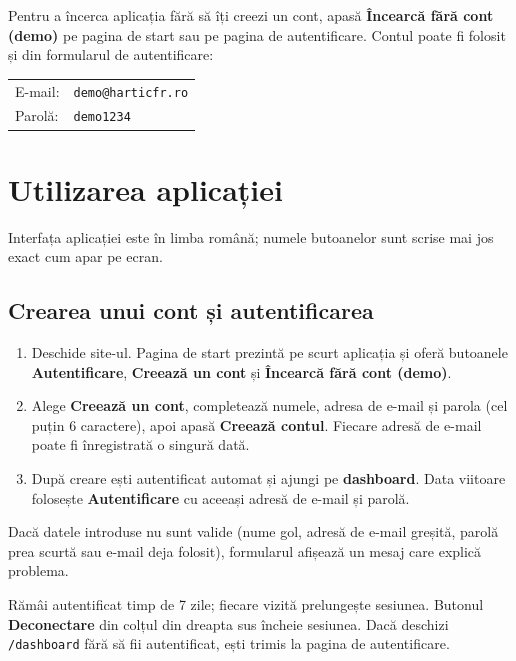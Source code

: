 \documentclass[11pt,a4paper]{article}
\newcommand{\code}[1]{\texttt{#1}}
\newcommand{\ui}[1]{\textsf{\textbf{#1}}}
\begin{document}
\begin{note}
Pentru a încerca aplicația fără să îți creezi un cont, apasă
\ui{Încearcă fără cont (demo)} pe pagina de start sau pe pagina de
autentificare. Contul poate fi folosit și din formularul de autentificare:

\begin{center}
\begin{tabular}{@{}ll@{}}
E-mail: & \code{demo@harticfr.ro} \\
Parolă: & \code{demo1234} \\
\end{tabular}
\end{center}
\end{note}

\section{Utilizarea aplicației}
\label{sec:usage}

Interfața aplicației este în limba română; numele butoanelor sunt scrise
mai jos exact cum apar pe ecran.

\subsection{Crearea unui cont și autentificarea}

\begin{enumerate}
  \item Deschide site-ul. Pagina de start prezintă pe scurt aplicația și
        oferă butoanele \ui{Autentificare}, \ui{Creează un cont} și
        \ui{Încearcă fără cont (demo)}.
  \item Alege \ui{Creează un cont}, completează numele, adresa de e-mail și
        parola (cel puțin 6 caractere), apoi apasă \ui{Creează contul}.
        Fiecare adresă de e-mail poate fi înregistrată o singură dată.
  \item După creare ești autentificat automat și ajungi pe
        \textbf{dashboard}. Data viitoare folosește \ui{Autentificare} cu
        aceeași adresă de e-mail și parolă.
\end{enumerate}

Dacă datele introduse nu sunt valide (nume gol, adresă de e-mail greșită,
parolă prea scurtă sau e-mail deja folosit), formularul afișează un mesaj care
explică problema.

Rămâi autentificat timp de 7 zile; fiecare vizită prelungește sesiunea.
Butonul \ui{Deconectare} din colțul din dreapta sus încheie sesiunea. Dacă
deschizi \code{/dashboard} fără să fii autentificat, ești trimis la pagina de
autentificare.
\end{document}
